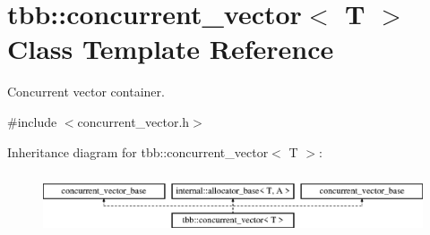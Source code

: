 \hypertarget{classtbb_1_1concurrent__vector}{}\section{tbb\+:\+:concurrent\+\_\+vector$<$ T $>$ Class Template Reference}
\label{classtbb_1_1concurrent__vector}


Concurrent vector container.  




{\ttfamily \#include $<$concurrent\+\_\+vector.\+h$>$}

Inheritance diagram for tbb\+:\+:concurrent\+\_\+vector$<$ T $>$\+:\begin{figure}[H]
\begin{center}
\leavevmode
\includegraphics[height=1.866667cm]{classtbb_1_1concurrent__vector}
\end{center}
\end{figure}
